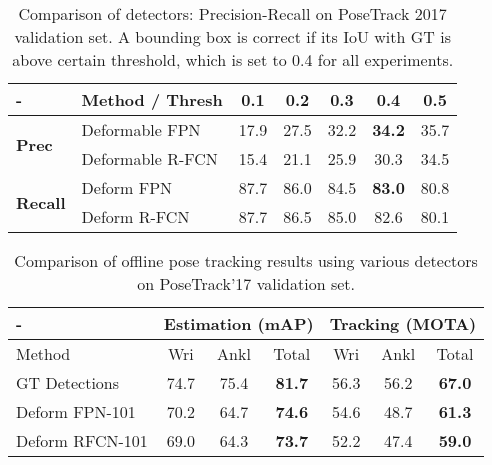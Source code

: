 \documentclass[10pt,twocolumn,letterpaper]{article}
\begin{document}
	\begin{table}[h]
		\vspace{-3pt}
		\setlength{\tabcolsep}{3pt}
\footnotesize
		\centering 
\begin{tabular}{llccccc}
			\toprule
			- &Method / Thresh  &  0.1 & 0.2 & 0.3 & \textbf{0.4} & 0.5 \\\midrule			\multirow{2}{*}{\textbf{Prec}} 
			&Deformable FPN & 17.9 & 27.5 &32.2 &\textbf{34.2}  &35.7 \\&Deformable R-FCN & 15.4 & 21.1 &25.9 &30.3  &34.5 \\\midrule
			\multirow{2}{*}{\textbf{Recall}}
			&Deform FPN & 87.7 &86.0 &84.5  &\textbf{83.0} &80.8 \\&Deform R-FCN & 87.7 &86.5 &85.0  &82.6 &80.1 \\\bottomrule
		\end{tabular}
		\vspace{3pt}
		\caption{Comparison of detectors: Precision-Recall on PoseTrack 2017 validation set. A bounding box is correct if its IoU with GT is above certain threshold, which is set to 0.4 for all experiments.}
		\label{table_detectors}
		\vspace{-.2in}
	\end{table}
	
	
	\begin{table}[h]
		\setlength{\tabcolsep}{4pt}
		\footnotesize
		\centering 
		\begin{tabular}{lcccccc}
			\toprule
			\multicolumn{1}{l}{ - }  
			&
			\multicolumn{3}{c}{ \textbf{Estimation (mAP) }}  
			&                                            
			\multicolumn{3}{c}{ \textbf{Tracking (MOTA)}} \\\midrule
			Method & Wri  & Ankl & Total  & Wri  & Ankl & Total \\
			
			\midrule
			GT Detections & 74.7  & 75.4 & \textbf{81.7} & 56.3 & 56.2 & \textbf{67.0} \\
			Deform FPN-101  & 70.2  & 64.7 &\textbf{ 74.6 } & 54.6 & 48.7 & \textbf{61.3} \\
			Deform RFCN-101 & 69.0 & 64.3 & \textbf{73.7}  & 52.2 & 47.4 & \textbf{59.0} \\
			\bottomrule
		\end{tabular}
		\vspace{3pt}
		\caption{Comparison of offline pose tracking results using various detectors on PoseTrack'17 validation set. }
		\label{table-gap-task1and3}
		\vspace{-.1in}
	\end{table}
	
\end{document}
